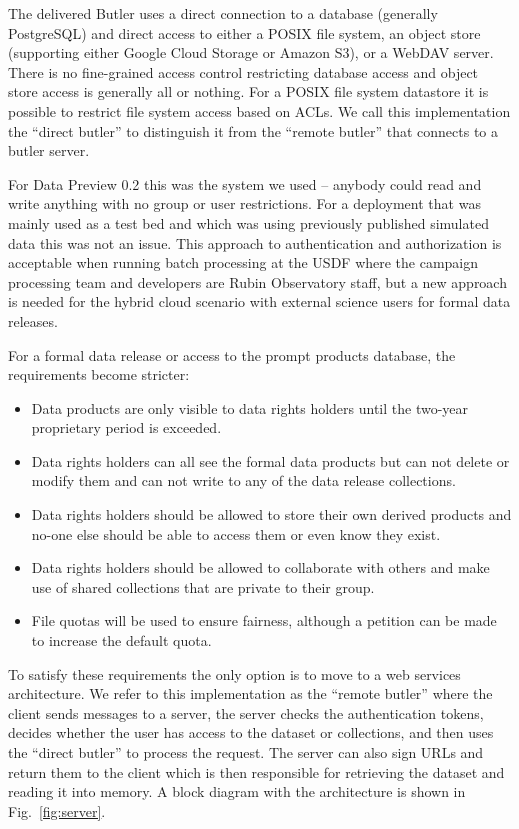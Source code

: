 The delivered Butler uses a direct connection to a database (generally PostgreSQL) and direct access to either a POSIX file system, an object store (supporting either Google Cloud Storage or Amazon S3), or a WebDAV server.
There is no fine-grained access control restricting database access and object store access is generally all or nothing.
For a POSIX file system datastore it is possible to restrict file system access based on ACLs.
We call this implementation the ``direct butler'' to distinguish it from the ``remote butler'' that connects to a butler server.

For Data Preview 0.2 \cite{RTN-041} this was the system we used -- anybody could read and write anything with no group or user restrictions.
For a deployment that was mainly used as a test bed and which was using previously published simulated data this was not an issue.
This approach to authentication and authorization is acceptable when running batch processing at the USDF where the campaign processing team and developers are Rubin Observatory staff, but a new approach is needed for the hybrid cloud scenario with external science users for formal data releases.

For a formal data release or access to the prompt products database, the requirements become stricter:

\begin{itemize}
\item Data products are only visible to data rights holders until the two-year proprietary period is exceeded.
\item Data rights holders can all see the formal data products but can not delete or modify them and can not write to any of the data release collections.
\item Data rights holders should be allowed to store their own derived products and no-one else should be able to access them or even know they exist.
\item Data rights holders should be allowed to collaborate with others and make use of shared collections that are private to their group.
\item File quotas will be used to ensure fairness, although a petition can be made to increase the default quota.
\end{itemize}

To satisfy these requirements the only option is to move to a web services architecture.
We refer to this implementation as the ``remote butler'' where the client sends messages to a server, the server checks the authentication tokens, decides whether the user has access to the dataset or collections, and then uses the ``direct butler'' to process the request.
The server can also sign URLs and return them to the client which is then responsible for retrieving the dataset and reading it into memory.
A block diagram with the architecture is shown in Fig.~\ref{fig:server}.

